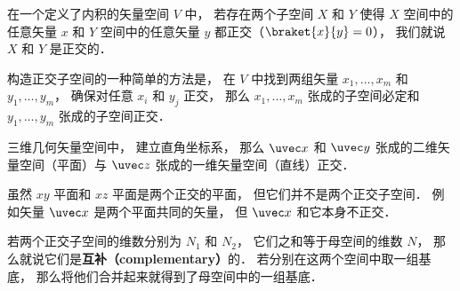 

在一个定义了内积的矢量空间 $V$ 中， 若存在两个子空间 $X$ 和 $Y$ 使得 $X$ 空间中的任意矢量 $x$ 和 $Y$ 空间中的任意矢量 $y$ 都正交（$\braket{x}{y} = 0$）， 我们就说 $X$ 和 $Y$ 是正交的．

构造正交子空间的一种简单的方法是， 在 $V$ 中找到两组矢量 $x_1, \dots, x_m$ 和 $y_1, \dots, y_m$， 确保对任意 $x_i$ 和 $y_j$ 正交， 那么 $x_1, \dots, x_m$ 张成的子空间必定和 $y_1, \dots, y_m$ 张成的子空间正交．

\begin{example}{}
三维几何矢量空间中， 建立直角坐标系， 那么 $\uvec x$ 和 $\uvec y$ 张成的二维矢量空间（平面）与 $\uvec z$ 张成的一维矢量空间（直线）正交．
\end{example}

\begin{example}{}
虽然 $xy$ 平面和 $xz$ 平面是两个正交的平面， 但它们并不是两个正交子空间． 例如矢量 $\uvec x$ 是两个平面共同的矢量， 但 $\uvec x$ 和它本身不正交．
\end{example}

若两个正交子空间的维数分别为 $N_1$ 和 $N_2$， 它们之和等于母空间的维数 $N$， 那么就说它们是\textbf{互补（complementary）}的． 若分别在这两个空间中取一组基底， 那么将他们合并起来就得到了母空间中的一组基底．
